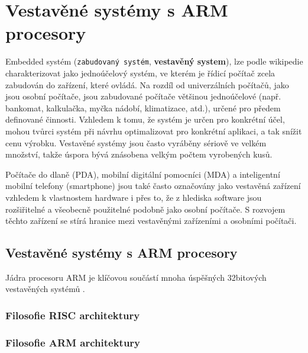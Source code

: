 %
\setchaptertoc
\chapter{Vestavěné systémy s ARM procesory}\label{chap:ces_arm}

Embedded systém (\texttt{zabudovaný systém}, \textbf{vestavěný system}), lze podle wikipedie 
charakterizovat jako jednoúčelový systém, ve kterém je řídicí počítač zcela zabudován do zařízení, 
které ovládá. Na rozdíl od univerzálních počítačů, jako jsou osobní počítače, jsou zabudované 
počítače většinou jednoúčelové (např. bankomat, kalkulačka, myčka nádobí, klimatizace, atd.), 
určené pro předem definované činnosti. Vzhledem k tomu, že systém je určen pro konkrétní účel, 
mohou tvůrci systém při návrhu optimalizovat pro konkrétní aplikaci, a tak snížit cenu výrobku. 
Vestavěné systémy jsou často vyráběny sériově ve velkém množství, takže úspora bývá znásobena 
velkým počtem vyrobených kusů.

Počítače do dlaně (PDA), mobilní digitální pomocníci (MDA) a inteligentní mobilní telefony 
(smartphone) jsou také často označovány jako vestavěná zařízení vzhledem k vlastnostem hardware i 
přes to, že z hlediska software jsou rozšiřitelné a všeobecně použitelné podobně jako osobní 
počítače. S rozvojem těchto zařízení se stírá hranice mezi vestavěnými zařízeními a osobními 
počítači.

\section{Vestavěné systémy s ARM procesory}
  Jádra procesoru ARM je klíčovou součástí mnoha úspěšných 32bitových vestavěných systémů 
  \cite[s.~3]{sloss2004arm}.
  
  \subsection{Filosofie RISC architektury}
  
  \subsection{Filosofie ARM architektury}
